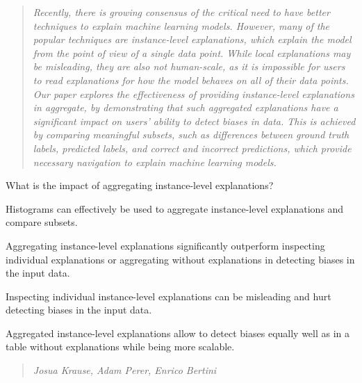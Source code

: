 \begin{quote}\textit{
Recently, there is growing consensus of the critical need to have better techniques to explain machine learning models.  However, many of the popular techniques are instance-level explanations, which explain the model from the point of view of a single data point.  While local explanations may be misleading, they are also not human-scale, as it is impossible for users to read explanations for how the model behaves on all of their data points.  Our paper explores the effectiveness of providing instance-level explanations in aggregate, by demonstrating that such aggregated explanations have a significant impact on users' ability to detect biases in data.
This is achieved by comparing meaningful subsets, such as differences between ground truth labels, predicted labels, and correct and incorrect predictions, which provide necessary navigation to explain machine learning models.
}
\end{quote}

\begin{contributions}{What is the impact of aggregating instance-level explanations?}
\item Histograms can effectively be used to aggregate instance-level explanations and compare subsets.
\item Aggregating instance-level explanations significantly outperform inspecting individual explanations or aggregating without explanations in detecting biases in the input data.
\item Inspecting individual instance-level explanations can be misleading and hurt detecting biases in the input data.
\item Aggregated instance-level explanations allow to detect biases equally well as in a table without explanations while being more scalable.
\end{contributions}

\begin{quote}
\textit{Josua Krause, Adam Perer, Enrico Bertini}
\end{quote}

